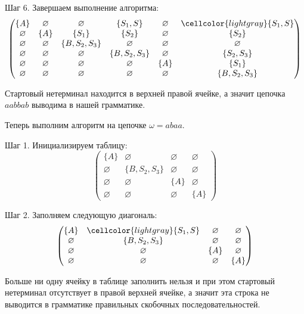 \begin{example}
    Шаг 6.
    Завершаем выполнение алгоритма:
    \[
        \begin{pmatrix}
            \{A\}       & \varnothing & \varnothing     & \{S_1, S\}      & \varnothing & \cellcolor{lightgray}\{S_1, S\} \\
            \varnothing & \{A\}       & \{S_1\}         & \{S_2\}         & \varnothing & \{S_2\}                         \\
            \varnothing & \varnothing & \{B, S_2, S_3\} & \varnothing     & \varnothing & \varnothing                     \\
            \varnothing & \varnothing & \varnothing     & \{B, S_2, S_3\} & \varnothing & \{S_2, S_3\}                    \\
            \varnothing & \varnothing & \varnothing     & \varnothing     & \{A\}       & \{S_1\}                         \\
            \varnothing & \varnothing & \varnothing     & \varnothing     & \varnothing & \{B, S_2, S_3\}
        \end{pmatrix}
    \]

    Стартовый нетерминал находится в верхней правой ячейке, а значит цепочка $a a b b a b$ выводима в нашей грамматике.
\end{example}

\begin{example}
    Теперь выполним алгоритм на цепочке $\omega=abaa$.

    Шаг 1.
    Инициализируем таблицу:
    \[
        \begin{pmatrix}
            \{A\}       & \varnothing     & \varnothing & \varnothing \\
            \varnothing & \{B, S_2, S_3\} & \varnothing & \varnothing \\
            \varnothing & \varnothing     & \{A\}       & \varnothing \\
            \varnothing & \varnothing     & \varnothing & \{A\}
        \end{pmatrix}
    \]

    Шаг 2.
    Заполняем следующую диагональ:
    \[
        \begin{pmatrix}
            \{A\}       & \cellcolor{lightgray}\{S_1, S\} & \varnothing & \varnothing \\
            \varnothing & \{B, S_2, S_3\}                 & \varnothing & \varnothing \\
            \varnothing & \varnothing                     & \{A\}       & \varnothing \\
            \varnothing & \varnothing                     & \varnothing & \{A\}
        \end{pmatrix}
    \]

    Больше ни одну ячейку в таблице заполнить нельзя и при этом стартовый нетерминал отсутствует в правой верхней ячейке, а значит эта строка не выводится в грамматике правильных скобочных последовательностей.
\end{example}


